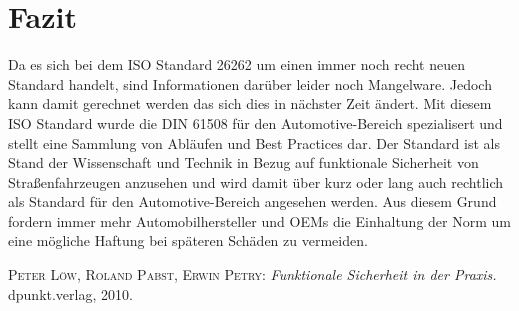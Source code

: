 \documentclass[a4paper,DIV=calc,ngerman]{scrartcl}
\begin{document}
\section{Fazit}
\label{sec:Fazit}
Da es sich bei dem ISO Standard 26262 um einen immer noch recht neuen Standard handelt, sind Informationen darüber leider noch Mangelware. Jedoch kann damit gerechnet werden das sich dies in nächster Zeit ändert. Mit diesem ISO Standard wurde die DIN 61508 für den Automotive-Bereich spezialisert und stellt eine Sammlung von Abläufen und Best Practices dar. Der Standard ist als Stand der Wissenschaft und Technik in Bezug auf funktionale Sicherheit von Straßenfahrzeugen anzusehen und wird damit über kurz oder lang auch rechtlich als Standard für den Automotive-Bereich angesehen werden. Aus diesem Grund fordern immer mehr Automobilhersteller und OEMs die Einhaltung der Norm um eine mögliche Haftung bei späteren Schäden zu vermeiden.





\begin{thebibliography}{------}
\label{sec:Literatur}

 \textsc{Peter Löw, Roland Pabst, Erwin Petry}: {\em Funktionale Sicherheit in der Praxis.} dpunkt.verlag, 2010.

\end{thebibliography}
\end{document}
